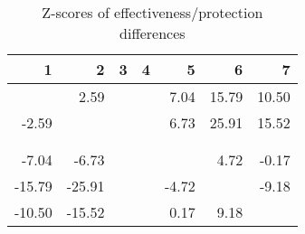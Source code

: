 \begin{table}[ht]
\centering
\begin{tabular}{rrrrrrr}
  \hline
1 & 2 & 3 & 4 & 5 & 6 & 7 \\ 
  \hline
 & 2.59 &  &  & 7.04 & 15.79 & 10.50 \\ 
  -2.59 &  &  &  & 6.73 & 25.91 & 15.52 \\ 
   &  &  &  &  &  &  \\ 
   &  &  &  &  &  &  \\ 
  -7.04 & -6.73 &  &  &  & 4.72 & -0.17 \\ 
  -15.79 & -25.91 &  &  & -4.72 &  & -9.18 \\ 
  -10.50 & -15.52 &  &  & 0.17 & 9.18 &  \\ 
   \hline
\end{tabular}
\caption{Z-scores of effectiveness/protection differences} 
\end{table}
